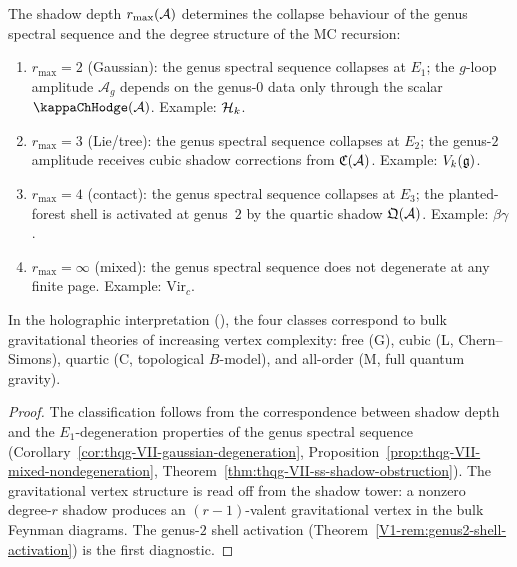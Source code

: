 \begin{theorem}
The shadow depth $r_{\max}(\mathcal{A})$ determines the collapse
behaviour of the genus spectral sequence and the degree
structure of the MC recursion:
\begin{enumerate}[label=\textup{(\roman*)}]
\item $r_{\max} = 2$ \textup{(}Gaussian\textup{)}:
 the genus spectral sequence collapses at $E_1$; the
 $g$-loop amplitude $\mathcal{A}_g$ depends on the genus-$0$
 data only through the scalar~$\kappaChHodge(\cA)$.
 Example: $\mathcal{H}_k$.
\item $r_{\max} = 3$ \textup{(}Lie/tree\textup{)}:
 the genus spectral sequence collapses at $E_2$; the
 genus-$2$ amplitude receives cubic shadow corrections from
 $\mathfrak{C}(\mathcal{A})$. Example: $V_k(\mathfrak{g})$.
\item $r_{\max} = 4$ \textup{(}contact\textup{)}:
 the genus spectral sequence collapses at $E_3$; the
 planted-forest shell is activated at genus~$2$ by the
 quartic shadow $\mathfrak{Q}(\mathcal{A})$. Example: $\beta\gamma$.
\item $r_{\max} = \infty$ \textup{(}mixed\textup{)}:
 the genus spectral sequence does not degenerate at any
 finite page. Example: $\mathrm{Vir}_c$.
\end{enumerate}
In the holographic interpretation \textup{(}\ClaimStatusHeuristic{}\textup{)},
the four classes correspond to bulk gravitational theories of
increasing vertex complexity: free \textup{(}G\textup{)},
cubic \textup{(}L, Chern--Simons\textup{)},
quartic \textup{(}C, topological $B$-model\textup{)},
and all-order \textup{(}M, full quantum gravity\textup{)}.
\end{theorem}

\begin{proof}
The classification follows from the correspondence between
shadow depth and the $E_1$-degeneration properties of the genus
spectral sequence
(Corollary~\ref{cor:thqg-VII-gaussian-degeneration},
Proposition~\ref{prop:thqg-VII-mixed-nondegeneration},
Theorem~\ref{thm:thqg-VII-ss-shadow-obstruction}).
The gravitational vertex structure is read off from the shadow
tower: a nonzero degree-$r$ shadow produces an $(r{-}1)$-valent
gravitational vertex in the bulk Feynman diagrams. The
genus-$2$ shell activation
(Theorem~\ref{V1-rem:genus2-shell-activation})
is the first diagnostic.
\end{proof}

